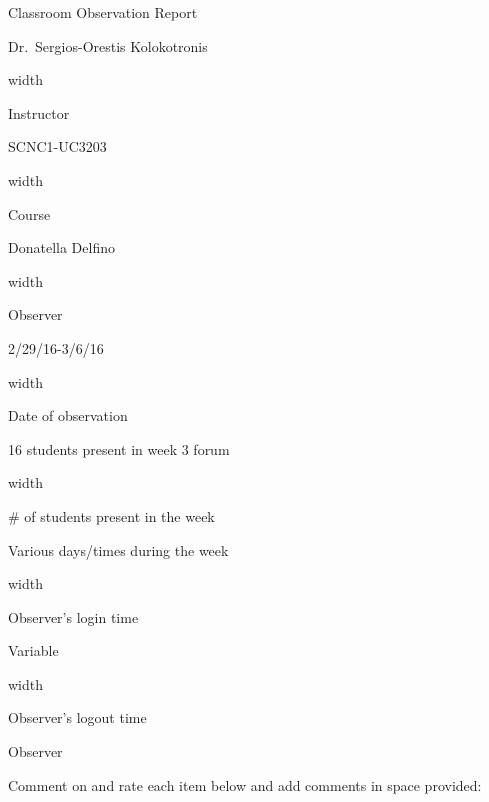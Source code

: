 \documentclass[11pt,dvipsnames]{article}
\newcommand*{\linesep}[1]{%
	\par\nobreak
	\vskip 3pt \leaders\vrule width #1\vskip 0.81pt
	\nobreak
}
\begin{document}
	\begin{center}
		{\Large Classroom Observation Report}
	\end{center}
\begin{minipage}{0.35\textwidth}
		Dr.~Sergios-Orestis Kolokotronis \par
		\linesep{\textwidth}
		Instructor
	\end{minipage}
\hspace{0.2\textwidth}
	\begin{minipage}{0.35\textwidth}
			SCNC1-UC3203 \par
			\linesep{\textwidth}
			Course
		\end{minipage}
		
\vskip 1cm
		
\begin{minipage}{0.35\textwidth}
	Donatella Delfino \par
	\linesep{\textwidth}
	Observer
\end{minipage}
\hspace{0.2\textwidth}
\begin{minipage}{0.35\textwidth}
	2/29/16-3/6/16 \par
	\linesep{\textwidth}
	Date of observation
\end{minipage}

\vskip 1cm

\begin{minipage}{0.35\textwidth}
	16 students present in week 3 forum \par
	\linesep{\textwidth}
	\# of students present in the week
\end{minipage}

\vskip 1cm

\begin{minipage}{0.35\textwidth}
	Various days/times during the week \par
	\linesep{\textwidth}
	Observer's login time
\end{minipage}
\hspace{0.2\textwidth}
\begin{minipage}{0.35\textwidth}
	Variable \par
	\linesep{\textwidth}
	Observer's logout time
\end{minipage}

\vskip 1cm
{\large Observer}

Comment on and rate each item below and add comments in space provided:
\vskip 0.5cm

		
\end{document}
